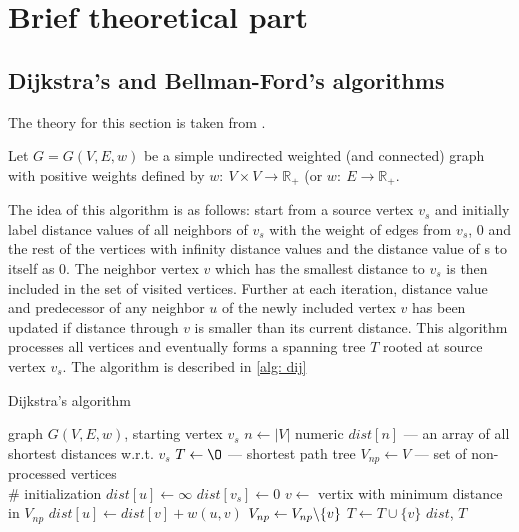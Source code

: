 \documentclass[12pt, bachelor, substylefile = algo_title.rtx]{disser}
\theoremstyle{definition}
\begin{document}
\section{Brief theoretical part}
\subsection{Dijkstra's and Bellman-Ford's algorithms}
The theory for this section is taken from \cite{erciyes18}.

Let $G = G(V, E, w)$ be a simple undirected weighted (and connected) graph with positive weights defined by $w:\ V \times V \to \mathbb{R}_+$ (or $w:\ E \to \mathbb{R}_+$.

The idea of this algorithm is as follows: start from a source vertex $v_s$ and initially
label distance values of all neighbors of $v_s$ with the weight of edges from $v_s$, $0$ and the
rest of the vertices with infinity distance values and the distance value of s to itself as
0. The neighbor vertex $v$ which has the smallest distance to $v_s$ is then included in the set of
visited vertices. Further at each iteration, distance value and predecessor of any
neighbor $u$ of the newly included vertex $v$ has been updated if distance through $v$ is
smaller than its current distance. This algorithm processes all vertices and eventually
forms a spanning tree $T$ rooted at source vertex $v_s$. The algorithm is described in \ref{alg: dij}

\begin{algorithm}[!h]
\caption{Dijkstra's algorithm}
\label{alg: dij}
\begin{algorithmic}

\Require graph $G(V, E, w)$, starting vertex $v_s$
\State $n \gets |V|$
\State  numeric $dist[n]$ --- an array of all shortest distances w.r.t. $v_s$
\State $T \gets \O$ --- shortest path tree
\State $V_{np} \gets V$ --- set of non-processed vertices\\
\# initialization
	\State $dist[u] \gets \infty$
\EndFor
\State $dist[v_s] \gets 0$
	\State	$v \gets$ vertix with minimum distance in $V_{np}$
			\State $dist[u] \gets dist[v] + w(u, v)$
		\EndIf
	\EndFor
	\State $V_{np} \gets V_{np}\symbol{92}\{v\}$
	\State $T \gets T \cup \{v\}$
\EndWhile
\Ensure $dist$, $T$
\end{algorithmic}
\end{algorithm}
\end{document}
